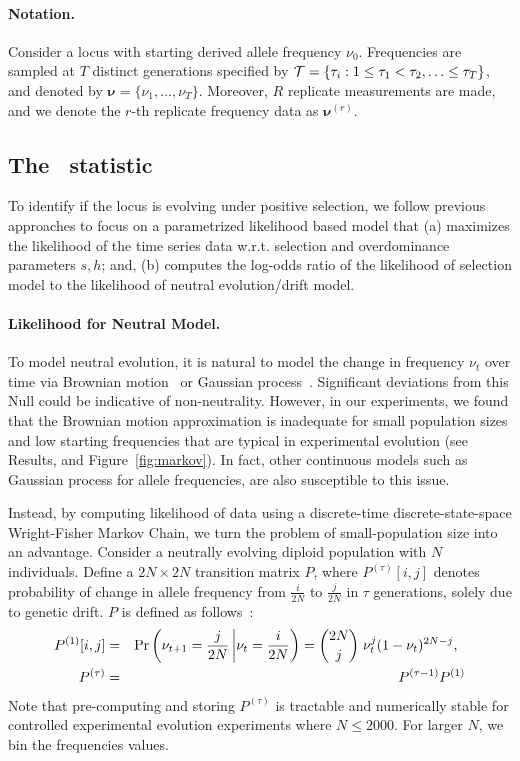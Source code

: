 \documentclass[11pt]{article}
\def\comale{\text{{\sc Comale}}}
\begin{document}
\paragraph{Notation.} 
Consider a locus with starting derived allele frequency
$\nu_0$. Frequencies are sampled at $T$ distinct generations specified
by ${\cal T}= \{\tau_i: 1\le \tau_1<\tau_2,\ldots\le \tau_T\}$, and
denoted by $\bm{\nu}=\{\nu_1,\ldots,\nu_T\}$. Moreover, $R$ replicate
measurements are made, and we denote the $r$-th replicate frequency
data as $\bm{\nu}^{(r)}$.

\subsection{The \comale\  statistic}
To identify if the locus is evolving under positive selection, we
follow previous approaches to focus on a parametrized likelihood based
model that (a) maximizes the likelihood of the time series data
w.r.t. selection and overdominance parameters $s,h$; and, (b) computes
the log-odds ratio of the likelihood of selection model to the
likelihood of neutral evolution/drift model.

\paragraph{Likelihood for Neutral Model.}
To model neutral evolution, it is natural to model the change in
frequency $\nu_t$ over time via Brownian
motion~\cite{feder2014Identifying} or Gaussian
process~\cite{Terhorst2015Multi}. Significant deviations from this
Null could be indicative of non-neutrality. However, in our
experiments, we found that the Brownian motion approximation is
inadequate for small population sizes and low starting frequencies
that are typical in experimental evolution (see Results, and
Figure~\ref{fig:markov}). In fact, other continuous models such as
Gaussian process for allele frequencies, are also susceptible to this
issue.

Instead, by computing likelihood of data using a discrete-time
discrete-state-space Wright-Fisher Markov Chain, we turn the problem
of small-population size into an advantage. Consider a neutrally
evolving diploid population with $N$ individuals. Define a
$2N\times2N$ transition matrix $P$, where $P^{(\tau)}[i,j]$ denotes
probability of change in allele frequency from $\frac{i}{2N}$ to
$\frac{j}{2N}$ in $\tau$ generations, solely due to genetic drift. $P$
is defined as follows~\cite{Ewens2012Mathematical}:
\begin{eqnarray}
  P^{(1)}[i,j] &=& \operatorname{Pr}\left(\nu_{t+1}=\frac{j}{2N} \left|
      \nu_{t}=\frac{i}{2N}\right)={2N \choose j} \right.  \nu_{t}^j
  (1-\nu_{t})^{2N-j}, \;\;\label{eq:P1}\\
  P^{(\tau)} &=&   P^{(\tau-1)}P^{(1)} \label{eq:Pt}
\end{eqnarray}
Note that pre-computing and storing $P^{(\tau)}$ is tractable and
numerically stable for controlled experimental evolution experiments
where $N\le2000$. For larger $N$, we bin the frequencies values.
\end{document}
